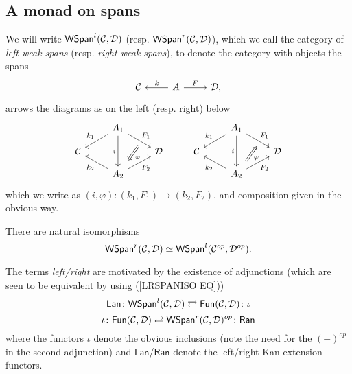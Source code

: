 \documentclass[a4paper,10pt]{article}%
\begin{document}
\subsection{A monad on spans}

\begin{definition}\label{WSPAN DEF}
We will write 
$\mathsf{WSpan}^l(\mathcal{C},\mathcal{D})$
(resp.
$\mathsf{WSpan}^r(\mathcal{C},\mathcal{D})$),
which we call the category of  \textit{left weak spans} (resp. \textit{right weak spans}),
to denote the category with objects the spans
\[
\begin{tikzcd}
\C & A \ar{l}[swap]{k} \ar{r}{F} & \D,
\end{tikzcd}
\]
arrows the diagrams as on the left (resp. right) below \begin{equation}\label{TWISTEDARROWRIGHT EQ}
	\begin{tikzcd}[row sep=small]
	&
	A_1 \ar{dl}[swap,name=k1]{k_1} \ar{dr}[name=F11]{F_1} \ar{dd}[swap]{i} & &
	&
	A_1 \ar{dl}[swap,name=k1]{k_1} \ar{dr}[name=F1]{F_1} \ar{dd}[swap]{i} 
\\
	\C & & \D &
	\C & & \D 
\\
		& |[alias=G21]| A_2  \ar{ul}{k_2} \ar{ur}[swap]{F_2} & &
		& |[alias=G2]| A_2  \ar{ul}{k_2} \ar{ur}[swap]{F_2} &
		\arrow[Leftarrow, from=F1, to=G2,shorten >=0.25cm,shorten <=0.25cm,"\varphi"]
		\arrow[Rightarrow, from=F11, to=G21,shorten >=0.25cm,shorten <=0.25cm,"\varphi"]
	\end{tikzcd}
\end{equation}
which we write as $(i,\varphi) \colon (k_1,F_1) \to (k_2,F_2)$, and composition given in the obvious way.
\end{definition}


\begin{remark}
There are natural isomorphisms
\begin{equation}\label{LRSPANISO EQ}
\mathsf{WSpan}^r(\mathcal{C},\mathcal{D}) \simeq \mathsf{WSpan}^l(\mathcal{C}^{op},\mathcal{D}^{op}).
\end{equation}
\end{remark}


\begin{remark}\label{RANLANADJ REM}
The terms \textit{left/right} are motivated by the existence of adjunctions (which are seen to be equivalent by using (\ref{LRSPANISO EQ}))
\[
	\mathsf{Lan} \colon
	\mathsf{WSpan}^l(\mathcal{C}, \mathcal{D})
		\rightleftarrows
	\mathsf{Fun}(\mathcal{C}, \mathcal{D})
	\colon \iota
\]
\[
	\iota \colon 
	\mathsf{Fun}(\mathcal{C}, \mathcal{D})
		\rightleftarrows
	\mathsf{WSpan}^r(\mathcal{C}, \mathcal{D})^{op}
	\colon \mathsf{Ran}
\]
where the functors $\iota$ denote the obvious inclusions 
(note the need for the $(\minus)^{op}$ in the second adjunction) 
and $\mathsf{Lan}$/$\mathsf{Ran}$ denote the left/right Kan extension functors.
\end{remark}
\end{document}
